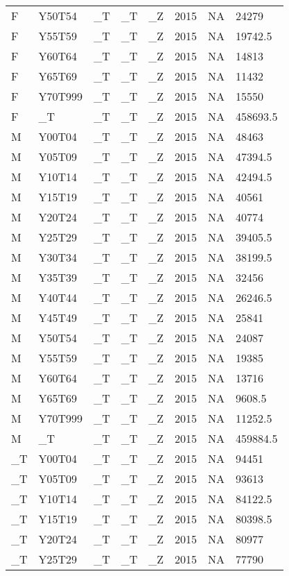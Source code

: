 \begin{longtable}[t]{llllllll}
\addlinespace
F & Y50T54 & \_T & \_T & \_Z & 2015 & NA & 24279\\
F & Y55T59 & \_T & \_T & \_Z & 2015 & NA & 19742.5\\
F & Y60T64 & \_T & \_T & \_Z & 2015 & NA & 14813\\
F & Y65T69 & \_T & \_T & \_Z & 2015 & NA & 11432\\
F & Y70T999 & \_T & \_T & \_Z & 2015 & NA & 15550\\
\addlinespace
F & \_T & \_T & \_T & \_Z & 2015 & NA & 458693.5\\
M & Y00T04 & \_T & \_T & \_Z & 2015 & NA & 48463\\
M & Y05T09 & \_T & \_T & \_Z & 2015 & NA & 47394.5\\
M & Y10T14 & \_T & \_T & \_Z & 2015 & NA & 42494.5\\
M & Y15T19 & \_T & \_T & \_Z & 2015 & NA & 40561\\
\addlinespace
M & Y20T24 & \_T & \_T & \_Z & 2015 & NA & 40774\\
M & Y25T29 & \_T & \_T & \_Z & 2015 & NA & 39405.5\\
M & Y30T34 & \_T & \_T & \_Z & 2015 & NA & 38199.5\\
M & Y35T39 & \_T & \_T & \_Z & 2015 & NA & 32456\\
M & Y40T44 & \_T & \_T & \_Z & 2015 & NA & 26246.5\\
\addlinespace
M & Y45T49 & \_T & \_T & \_Z & 2015 & NA & 25841\\
M & Y50T54 & \_T & \_T & \_Z & 2015 & NA & 24087\\
M & Y55T59 & \_T & \_T & \_Z & 2015 & NA & 19385\\
M & Y60T64 & \_T & \_T & \_Z & 2015 & NA & 13716\\
M & Y65T69 & \_T & \_T & \_Z & 2015 & NA & 9608.5\\
\addlinespace
M & Y70T999 & \_T & \_T & \_Z & 2015 & NA & 11252.5\\
M & \_T & \_T & \_T & \_Z & 2015 & NA & 459884.5\\
\_T & Y00T04 & \_T & \_T & \_Z & 2015 & NA & 94451\\
\_T & Y05T09 & \_T & \_T & \_Z & 2015 & NA & 93613\\
\_T & Y10T14 & \_T & \_T & \_Z & 2015 & NA & 84122.5\\
\addlinespace
\_T & Y15T19 & \_T & \_T & \_Z & 2015 & NA & 80398.5\\
\_T & Y20T24 & \_T & \_T & \_Z & 2015 & NA & 80977\\
\_T & Y25T29 & \_T & \_T & \_Z & 2015 & NA & 77790\\

\end{longtable}
